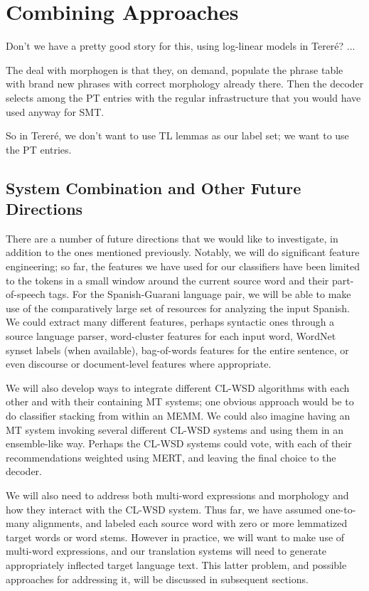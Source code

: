 \chapter{Combining Approaches}

Don't we have a pretty good story for this, using log-linear models in Tereré?
...

The deal with morphogen \cite{chahuneau:2013:emnlp}
is that they, on demand, populate the phrase table with brand new phrases with
correct morphology already there. Then the decoder selects among the PT entries
with the regular infrastructure that you would have used anyway for SMT.

So in Tereré, we don't want to use TL lemmas as our label set; we want to use
the PT entries.

\section{System Combination and Other Future Directions}
There are a number of future directions that we would like to investigate, in
addition to the ones mentioned previously.
Notably, we will do significant feature engineering; so far, the features we
have used for our classifiers have been limited to the tokens in a small window
around the current source word and their part-of-speech tags.
For the Spanish-Guarani language pair, we will be able to make use of
the comparatively large set of resources for analyzing the input Spanish.
We could extract many different features, perhaps syntactic ones through a
source language parser, word-cluster features for each input word, WordNet
synset labels (when available), bag-of-words features for the entire sentence,
or even discourse or document-level features where appropriate.

We will also develop ways to integrate different CL-WSD algorithms with each
other and with their containing MT systems; one obvious approach would be to do
classifier stacking from within an MEMM.
We could also imagine having an MT system invoking several different CL-WSD
systems and using them in an ensemble-like way.
Perhaps the CL-WSD systems could vote, with each of their recommendations
weighted using MERT, and leaving the final choice to the decoder.

We will also need to address both multi-word expressions and morphology and how
they interact with the CL-WSD system.
Thus far, we have assumed one-to-many alignments, and labeled each source word
with zero or more lemmatized target words or word stems.
However in practice, we will want to make use of multi-word expressions, and
our translation systems will need to generate appropriately inflected target
language text. This latter problem, and possible approaches for addressing it,
will be discussed in subsequent sections.

